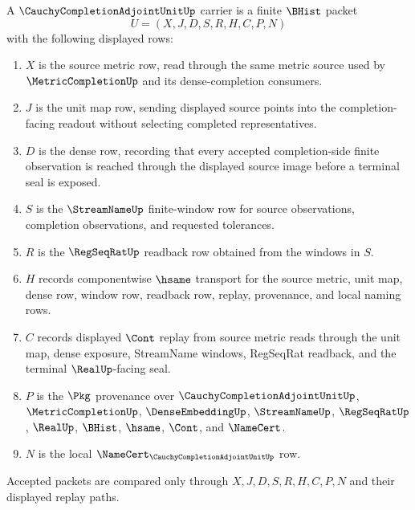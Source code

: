 \begin{definition}
\label{def:cauchy-completion-adjoint-unit-carrier}
A $\CauchyCompletionAdjointUnitUp$ carrier is a finite $\BHist$ packet
$$
U=(X,J,D,S,R,H,C,P,N)
$$
with the following displayed rows:
\begin{enumerate}
\item $X$ is the source metric row, read through the same metric source used by $\MetricCompletionUp$ and its dense-completion consumers.
\item $J$ is the unit map row, sending displayed source points into the completion-facing readout without selecting completed representatives.
\item $D$ is the dense row, recording that every accepted completion-side finite observation is reached through the displayed source image before a terminal seal is exposed.
\item $S$ is the $\StreamNameUp$ finite-window row for source observations, completion observations, and requested tolerances.
\item $R$ is the $\RegSeqRatUp$ readback row obtained from the windows in $S$.
\item $H$ records componentwise $\hsame$ transport for the source metric, unit map, dense row, window row, readback row, replay, provenance, and local naming rows.
\item $C$ records displayed $\Cont$ replay from source metric reads through the unit map, dense exposure, StreamName windows, RegSeqRat readback, and the terminal $\RealUp$-facing seal.
\item $P$ is the $\Pkg$ provenance over $\CauchyCompletionAdjointUnitUp$, $\MetricCompletionUp$, $\DenseEmbeddingUp$, $\StreamNameUp$, $\RegSeqRatUp$, $\RealUp$, $\BHist$, $\hsame$, $\Cont$, and $\NameCert$.
\item $N$ is the local $\NameCert_{\CauchyCompletionAdjointUnitUp}$ row.
\end{enumerate}
Accepted packets are compared only through $X,J,D,S,R,H,C,P,N$ and their displayed replay paths.
\end{definition}


